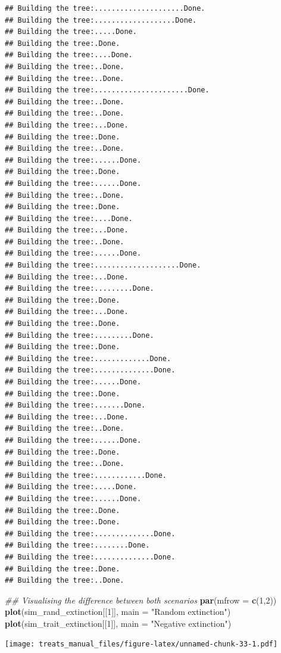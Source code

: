 \documentclass[
]{book}
\newenvironment{Shaded}{\begin{snugshade}}{\end{snugshade}}
\newcommand{\CommentTok}[1]{\textcolor[rgb]{0.56,0.35,0.01}{\textit{#1}}}
\newcommand{\DataTypeTok}[1]{\textcolor[rgb]{0.13,0.29,0.53}{#1}}
\newcommand{\DecValTok}[1]{\textcolor[rgb]{0.00,0.00,0.81}{#1}}
\newcommand{\KeywordTok}[1]{\textcolor[rgb]{0.13,0.29,0.53}{\textbf{#1}}}
\newcommand{\NormalTok}[1]{#1}
\newcommand{\StringTok}[1]{\textcolor[rgb]{0.31,0.60,0.02}{#1}}
\begin{document}
\begin{verbatim}
## Building the tree:.....................Done.
## Building the tree:...................Done.
## Building the tree:.....Done.
## Building the tree:.Done.
## Building the tree:....Done.
## Building the tree:..Done.
## Building the tree:..Done.
## Building the tree:......................Done.
## Building the tree:..Done.
## Building the tree:..Done.
## Building the tree:...Done.
## Building the tree:.Done.
## Building the tree:..Done.
## Building the tree:......Done.
## Building the tree:.Done.
## Building the tree:......Done.
## Building the tree:..Done.
## Building the tree:.Done.
## Building the tree:....Done.
## Building the tree:...Done.
## Building the tree:..Done.
## Building the tree:......Done.
## Building the tree:....................Done.
## Building the tree:...Done.
## Building the tree:.........Done.
## Building the tree:.Done.
## Building the tree:...Done.
## Building the tree:.Done.
## Building the tree:.........Done.
## Building the tree:.Done.
## Building the tree:.............Done.
## Building the tree:..............Done.
## Building the tree:......Done.
## Building the tree:.Done.
## Building the tree:.......Done.
## Building the tree:...Done.
## Building the tree:..Done.
## Building the tree:......Done.
## Building the tree:.Done.
## Building the tree:..Done.
## Building the tree:............Done.
## Building the tree:.....Done.
## Building the tree:......Done.
## Building the tree:.Done.
## Building the tree:.Done.
## Building the tree:..............Done.
## Building the tree:........Done.
## Building the tree:..............Done.
## Building the tree:.Done.
## Building the tree:..Done.
\end{verbatim}

\begin{Shaded}
\begin{Highlighting}[]
\CommentTok{\#\# Visualising the difference between both scenarios}
\KeywordTok{par}\NormalTok{(}\DataTypeTok{mfrow =} \KeywordTok{c}\NormalTok{(}\DecValTok{1}\NormalTok{,}\DecValTok{2}\NormalTok{))}
\KeywordTok{plot}\NormalTok{(sim\_rand\_extinction[[}\DecValTok{1}\NormalTok{]], }\DataTypeTok{main =} \StringTok{"Random extinction"}\NormalTok{)}
\KeywordTok{plot}\NormalTok{(sim\_trait\_extinction[[}\DecValTok{1}\NormalTok{]], }\DataTypeTok{main =} \StringTok{"Negative extinction"}\NormalTok{)}
\end{Highlighting}
\end{Shaded}

\texttt{[image: treats\_manual\_files/figure-latex/unnamed-chunk-33-1.pdf]}
\end{document}
